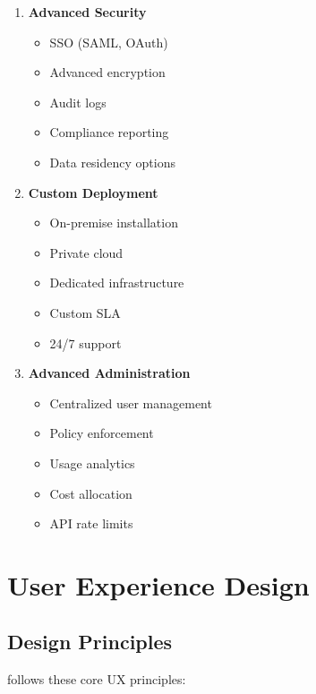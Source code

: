 \begin{enumerate}
    \item \textbf{Advanced Security}
    \begin{itemize}
        \item SSO (SAML, OAuth)
        \item Advanced encryption
        \item Audit logs
        \item Compliance reporting
        \item Data residency options
    \end{itemize}
    
    \item \textbf{Custom Deployment}
    \begin{itemize}
        \item On-premise installation
        \item Private cloud
        \item Dedicated infrastructure
        \item Custom SLA
        \item 24/7 support
    \end{itemize}
    
    \item \textbf{Advanced Administration}
    \begin{itemize}
        \item Centralized user management
        \item Policy enforcement
        \item Usage analytics
        \item Cost allocation
        \item API rate limits
    \end{itemize}
\end{enumerate}

\section{User Experience Design}

\subsection{Design Principles}

\lifeos{} follows these core UX principles:


